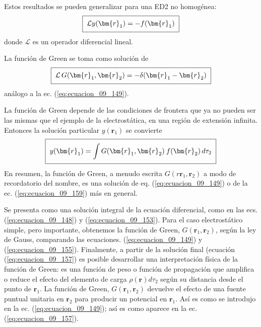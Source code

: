 \par
Estos resultados se pueden generalizar para una ED2 no homogénea:
\begin{equation}
\setlength{\fboxsep}{2\fboxsep}\boxed{\mathcal{L} y (\bm{r}_{1}) = - f (\bm{r}_{1})}
\label{eq:ecuacion_09_158}
\end{equation}
donde $\mathcal{L}$ es un operador diferencial lineal.
\par
La función de Green se toma como solución de
\begin{equation}
\setlength{\fboxsep}{2\fboxsep}\boxed{\mathcal{L} \, G(\bm{r}_{1} , \bm{r}_{2}) = - \delta (\bm{r}_{1} - \bm{r}_{2})}
\label{eq:ecuacion_09_159}
\end{equation}
análogo a la ec. (\ref{eq:ecuacion_09_149}).
\par
La función de Green depende de las condiciones de frontera que ya no pueden ser las mismas que el ejemplo de la electrostática, en una región de extensión infinita. Entonces la solución particular $y (\bm{r}_{1})$ se convierte
\begin{equation}
\setlength{\fboxsep}{2\fboxsep}\boxed{y (\bm{r}_{1}) = \int G (\bm{r}_{1} , \bm{r}_{2}) \: f(\bm{r}_{2}) \, d \tau_{2}}
\label{eq:ecuacion_09_160}
\end{equation}
En resumen, la función de Green, a menudo escrita $G (r\bm{r}_{1} , \bm{r}_{2})$ a modo de recordatorio del nombre, es una solución de eq. (\ref{eq:ecuacion_09_149}) o de la ec. (\ref{eq:ecuacion_09_159}) más en general.
\par
Se presenta como una solución integral de la ecuación diferencial, como en las ecs. (\ref{eq:ecuacion_09_148}) y (\ref{eq:ecuacion_09_153}). Para el caso electrostático simple, pero importante, obtenemos la función de Green, $G (\bm{r}_{1} , \bm{r}_{2})$, según la ley de Gauss, comparando las ecuaciones. (\ref{eq:ecuacion_09_149}) y (\ref{eq:ecuacion_09_155}). Finalmente, a partir de la solución final (ecuación (\ref{eq:ecuacion_09_157}) es posible desarrollar una interpretación física de la función de Green: es una función de peso o función de propagación que amplifica o reduce el efecto del elemento de carga $\rho (\bm{r}) d \tau_{2}$ según su distancia desde el punto de $\bm{r}_{1}$. La función de Green, $G (\bm{r}_{1} , \bm{r}_{2})$ devuelve el efecto de una fuente puntual unitaria en $\bm{r}_{2}$ para producir un potencial en $\bm{r}_{1}$. Así es como se introdujo en la ec. (\ref{eq:ecuacion_09_149}); así es como aparece en la ec. (\ref{eq:ecuacion_09_157}).
